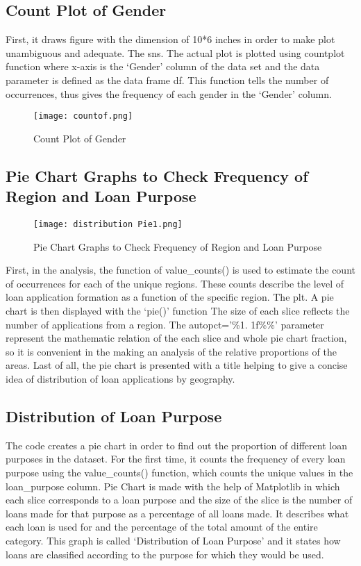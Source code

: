 \documentclass[12pt, a4paper,oneside]{book}
\numberwithin{equation}{section}
\begin{document}
\newpage
\subsection{Count Plot of Gender}

First, it draws figure with the dimension of 10*6 inches in order to make plot unambiguous and adequate. The sns. The actual plot is plotted using countplot function where x-axis is the ‘Gender’ column of the data set and the data parameter is defined as the data frame df. This function tells the number of occurrences, thus gives the frequency of each gender in the ‘Gender’ column. 

\begin{figure}[ht]
    \centering
    \texttt{[image: countof.png]}  
    \caption{Count Plot of Gender}
    \label{fig:subsubsection}
\end{figure}
\FloatBarrier


\subsection{ Pie Chart Graphs to Check Frequency of Region and Loan Purpose}
\begin{figure}[H]
    \centering
    \texttt{[image: distribution Pie1.png]}  
    \caption{Pie Chart Graphs to Check Frequency of Region and Loan Purpose}
    \label{fig:subsubsection}
\end{figure}
\FloatBarrier
First, in the analysis, the function of value\_counts() is used to estimate the count of occurrences for each of the unique regions. These counts describe the level of loan application formation as a function of the specific region. The plt. A pie chart is then displayed with the ‘pie()’ function The size of each slice reflects the number of applications from a region. The autopct='\%1. 1f\%\%' parameter represent the mathematic relation of the each slice and whole pie chart fraction, so it is convenient in the making an analysis of the relative proportions of the areas. Last of all, the pie chart is presented with a title helping to give a concise idea of distribution of loan applications by geography. 

\subsection{Distribution of Loan Purpose}

The code creates a pie chart in order to find out the proportion of different loan purposes in the dataset. For the first time, it counts the frequency of every loan purpose using the value\_counts() function, which counts the unique values in the loan\_purpose column. Pie Chart is made with the help of Matplotlib in which each slice corresponds to a loan purpose and the size of the slice is the number of loans made for that purpose as a percentage of all loans made. It describes what each loan is used for and the percentage of the total amount of the entire category. This graph is called ‘Distribution of Loan Purpose’ and it states how loans are classified according to the purpose for which they would be used.
\end{document}
